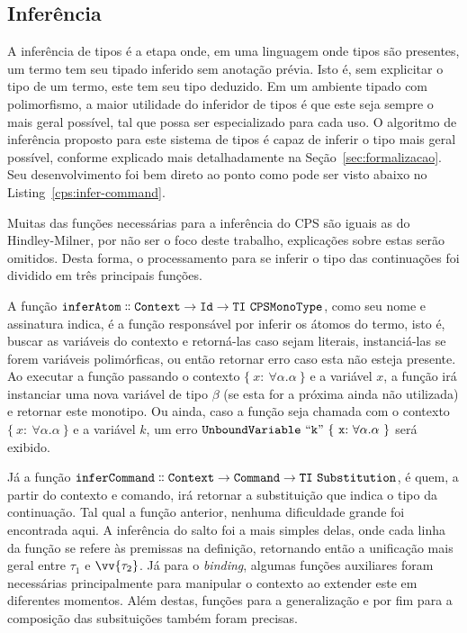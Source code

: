 \subsection{Inferência}\label{subsec:cps-inferer}
A inferência de tipos é a etapa onde, em uma linguagem onde tipos são presentes, um termo tem seu tipado inferido sem anotação prévia.
Isto é, sem explicitar o tipo de um termo, este tem seu tipo deduzido.
Em um ambiente tipado com polimorfismo, a maior utilidade do inferidor de tipos é que este seja sempre o mais geral possível, tal que possa ser especializado para cada uso.
O algoritmo de inferência proposto para este sistema de tipos é capaz de inferir o tipo mais geral possível, conforme explicado mais detalhadamente na Seção~\ref{sec:formalizacao}.
Seu desenvolvimento foi bem direto ao ponto como pode ser visto abaixo no Listing~\ref{cps:infer-command}.


Muitas das funções necessárias para a inferência do CPS são iguais as do Hindley-Milner, por não ser o foco deste trabalho, explicações sobre estas serão omitidos.
Desta forma, o processamento para se inferir o tipo das continuações foi dividido em três principais funções.

A função $\mathtt{inferAtom \dblcolon Context \to Id \to TI\ CPSMonoType}$, como seu nome e assinatura indica, é a função responsável por inferir os átomos do termo, isto é, buscar as variáveis do contexto e retorná-las caso sejam literais, instanciá-las se forem variáveis polimórficas, ou então retornar erro caso esta não esteja presente.
Ao executar a função passando o contexto $\{\ x{:}\ \forall\alpha.\alpha \ \}$ e a variável $x$, a função irá instanciar uma nova variável de tipo $\beta$ (se esta for a próxima ainda não utilizada) e retornar este monotipo.
Ou ainda, caso a função seja chamada com o contexto $\{\ x{:}\ \forall\alpha.\alpha \ \}$ e a variável $k$, um erro $\mathtt{UnboundVariable\ ``k"\ \{\ x{:}\ \forall\alpha.\alpha \ \}}$ será exibido.

Já a função $\mathtt{inferCommand \dblcolon Context \to Command \to TI\ Substitution}$, é quem, a partir do contexto e comando, irá retornar a substituição que indica o tipo da continuação.
Tal qual a função anterior, nenhuma dificuldade grande foi encontrada aqui.
A inferência do salto foi a mais simples delas, onde cada linha da função se refere às premissas na definição, retornando então a unificação mais geral entre $\tau_1$ e $\vv{\tau_2}$.
Já para o \textit{binding}, algumas funções auxiliares foram necessárias principalmente para manipular o contexto ao extender este em diferentes momentos.
Além destas, funções para a generalização e por fim para a composição das subsituições também foram precisas.

